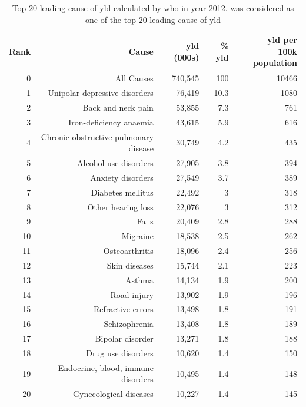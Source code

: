 	\begin{table}[ht]
		\centering
		\caption[Top 20 leading cause of ]{Top 20 leading cause of \gls{yld} calculated by \gls{who} in year 2012.
			 was considered as one of the top 20 leading cause of \gls{yld}\citep{Geneva2013}}
		\begin{tabular}{rrrrr}
			\toprule
			Rank  & Cause & \gls{yld} (000s) & \% \gls{yld} & \specialcell[b]{\gls{yld} per \\100k population}\\
			\midrule
			0     & All Causes & 740,545 & 100   & 10466 \\
			1     & Unipolar depressive disorders & 76,419 & 10.3  & 1080 \\
			2     & Back and neck pain & 53,855 & 7.3   & 761 \\
			3     & Iron-deficiency anaemia & 43,615 & 5.9   & 616 \\
			4     & Chronic obstructive pulmonary disease & 30,749 & 4.2   & 435 \\
			5     & Alcohol use disorders & 27,905 & 3.8   & 394 \\
			6     & Anxiety disorders & 27,549 & 3.7   & 389 \\
			7     & Diabetes mellitus & 22,492 & 3     & 318 \\
			8     & Other hearing loss & 22,076 & 3     & 312 \\
			9     & Falls & 20,409 & 2.8   & 288 \\
			10    & Migraine & 18,538 & 2.5   & 262 \\
			11    & Osteoarthritis & 18,096 & 2.4   & 256 \\
			12    & Skin diseases & 15,744 & 2.1   & 223 \\
			13    & Asthma & 14,134 & 1.9   & 200 \\
			14    & Road injury & 13,902 & 1.9   & 196 \\
			15    & Refractive errors & 13,498 & 1.8   & 191 \\
			16    & Schizophrenia & 13,408 & 1.8   & 189 \\
			17    & Bipolar disorder & 13,271 & 1.8   & 188 \\
			18    & Drug use disorders & 10,620 & 1.4   & 150 \\
			19    & Endocrine, blood, immune disorders & 10,495 & 1.4   & 148 \\
			20    & Gynecological diseases & 10,227 & 1.4   & 145 \\
			\bottomrule
		\end{tabular}%
		\label{tab:whoYLD}%
	\end{table}%
	
